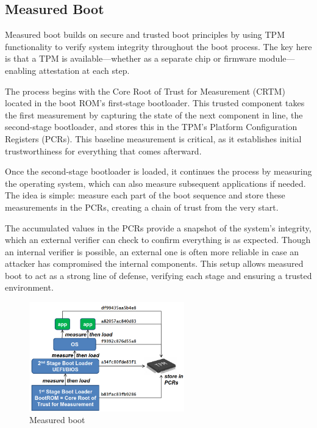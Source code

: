 \subsection{Measured Boot}

Measured boot builds on secure and trusted boot principles by using
TPM functionality to verify system integrity throughout the boot
process. The key here is that a TPM is available—whether as a separate
chip or firmware module—enabling attestation at each step.

The process begins with the Core Root of Trust for Measurement (CRTM)
located in the boot ROM’s first-stage bootloader. This trusted
component takes the first measurement by capturing the state of the
next component in line, the second-stage bootloader, and stores this
in the TPM’s Platform Configuration Registers (PCRs). This baseline
measurement is critical, as it establishes initial trustworthiness for
everything that comes afterward.

Once the second-stage bootloader is loaded, it continues the process
by measuring the operating system, which can also measure subsequent
applications if needed. The idea is simple: measure each part of the
boot sequence and store these measurements in the PCRs, creating a
chain of trust from the very start.

The accumulated values in the PCRs provide a snapshot of the system’s
integrity, which an external verifier can check to confirm everything
is as expected. Though an internal verifier is possible, an external
one is often more reliable in case an attacker has compromised the
internal components. This setup allows measured boot to act as a
strong line of defense, verifying each stage and ensuring a trusted
environment.

\begin{figure}[H]
  \centering
  \includegraphics[width=0.6\textwidth]{img/Measured boot.png}
  \caption{Measured boot}
\end{figure}
